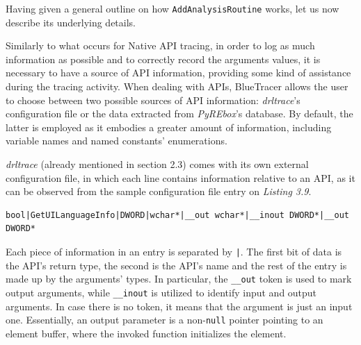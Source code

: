 Having given a general outline on how \texttt{AddAnalysisRoutine} works, let us now describe its underlying details.

Similarly to what occurs for Native API tracing, in order to log as much information as possible and to correctly record the arguments values, it is necessary to have a source of API information, providing some kind of assistance during the tracing activity. When dealing with APIs, BlueTracer allows the user to choose between two possible sources of API information: \textit{drltrace}'s configuration file or the data extracted from \textit{PyREbox}'s database. By default, the latter is employed as it embodies a greater amount of information, including variable names and named constants' enumerations.

\textit{drltrace} (already mentioned in section 2.3) comes with its own external configuration file, in which each line contains information relative to an API, as it can be observed from the sample configuration file entry on \textit{Listing 3.9}.      
\vspace{1cm}
\begin{lstlisting}[caption={Sample entry in \textit{drltrace} configuration file},captionpos=b]
bool|GetUILanguageInfo|DWORD|wchar*|__out wchar*|__inout DWORD*|__out DWORD*
\end{lstlisting}

Each piece of information in an entry is separated by \texttt{|}. The first bit of data is the API's return type, the second is the API's name and the rest of the entry is made up by the arguments' types. In particular, the \texttt{\_\_out} token is used to mark output arguments, while \texttt{\_\_inout} is utilized to identify input and output arguments. In case there is no token, it means that the argument is just an input one. Essentially, an output parameter is a non-\texttt{null} pointer pointing to an element buffer, where the invoked function initializes the element.   

